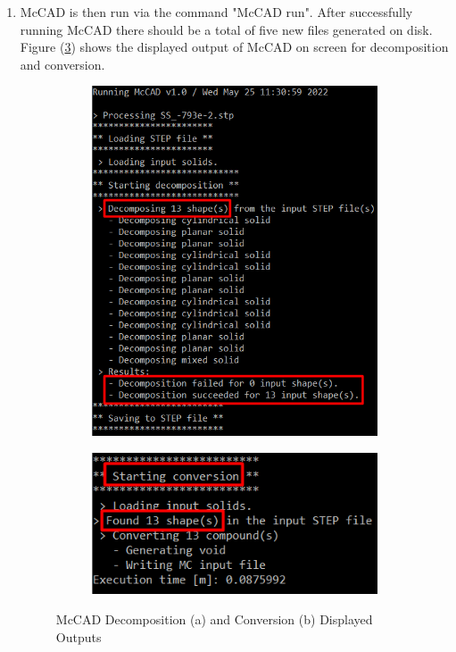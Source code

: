 \documentclass[12pt, a4paper, titlepage]{article}
\begin{document}
\begin{enumerate}
  \item McCAD is then run via the command "McCAD run". After successfully running McCAD there should be a total of five new files generated on disk. Figure (\ref{fig:McCAD Decomposition and Conversion Outputs}) shows the displayed output of McCAD on screen for decomposition and conversion.
  \begin{figure}[h!]
  	\centering
  	\begin{subfigure}{.5\textwidth}
  		\centering
  		\includegraphics[width=.8\linewidth]{figures/McCAD_output_decomposition.png}
  		\caption{}
  		\label{fig:a}
  	\end{subfigure}%
  	\begin{subfigure}{.5\textwidth}
  		\centering
  		\includegraphics[width=.8\linewidth]{figures/McCAD_output_conversion.png}
  		\caption{}
  		\label{fig:b}
  	\end{subfigure}
  	\caption{McCAD Decomposition (a) and Conversion (b) Displayed Outputs}
  	\label{fig:McCAD Decomposition and Conversion Outputs}
  \end{figure}


\end{enumerate}
\end{document}
